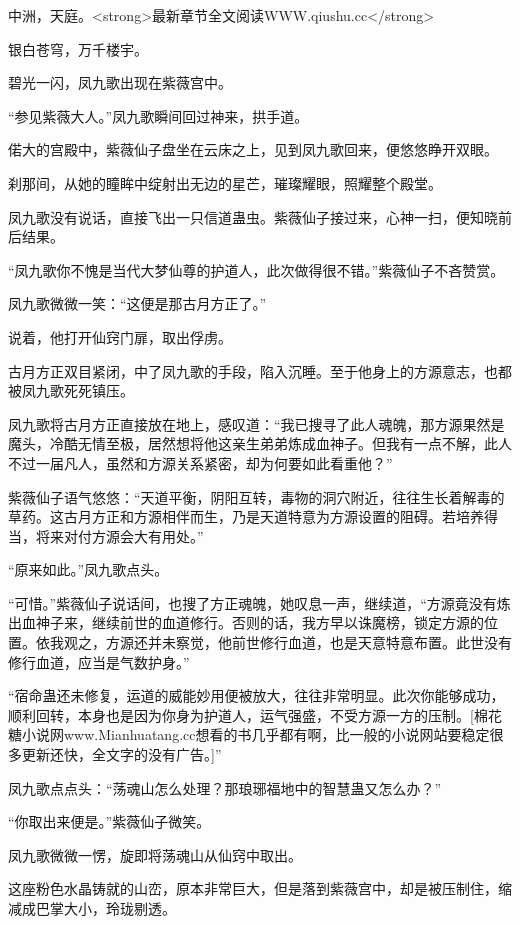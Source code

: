 
\begin{this_body}

中洲，天庭。<strong>最新章节全文阅读WWW.qiushu.cc</strong>

银白苍穹，万千楼宇。

碧光一闪，凤九歌出现在紫薇宫中。

“参见紫薇大人。”凤九歌瞬间回过神来，拱手道。

偌大的宫殿中，紫薇仙子盘坐在云床之上，见到凤九歌回来，便悠悠睁开双眼。

刹那间，从她的瞳眸中绽射出无边的星芒，璀璨耀眼，照耀整个殿堂。

凤九歌没有说话，直接飞出一只信道蛊虫。紫薇仙子接过来，心神一扫，便知晓前后结果。

“凤九歌你不愧是当代大梦仙尊的护道人，此次做得很不错。”紫薇仙子不吝赞赏。

凤九歌微微一笑：“这便是那古月方正了。”

说着，他打开仙窍门扉，取出俘虏。

古月方正双目紧闭，中了凤九歌的手段，陷入沉睡。至于他身上的方源意志，也都被凤九歌死死镇压。

凤九歌将古月方正直接放在地上，感叹道：“我已搜寻了此人魂魄，那方源果然是魔头，冷酷无情至极，居然想将他这亲生弟弟炼成血神子。但我有一点不解，此人不过一届凡人，虽然和方源关系紧密，却为何要如此看重他？”

紫薇仙子语气悠悠：“天道平衡，阴阳互转，毒物的洞穴附近，往往生长着解毒的草药。这古月方正和方源相伴而生，乃是天道特意为方源设置的阻碍。若培养得当，将来对付方源会大有用处。”

“原来如此。”凤九歌点头。

“可惜。”紫薇仙子说话间，也搜了方正魂魄，她叹息一声，继续道，“方源竟没有炼出血神子来，继续前世的血道修行。否则的话，我方早以诛魔榜，锁定方源的位置。依我观之，方源还并未察觉，他前世修行血道，也是天意特意布置。此世没有修行血道，应当是气数护身。”

“宿命蛊还未修复，运道的威能妙用便被放大，往往非常明显。此次你能够成功，顺利回转，本身也是因为你身为护道人，运气强盛，不受方源一方的压制。[棉花糖小说网www.Mianhuatang.cc想看的书几乎都有啊，比一般的小说网站要稳定很多更新还快，全文字的没有广告。]”

凤九歌点点头：“荡魂山怎么处理？那琅琊福地中的智慧蛊又怎么办？”

“你取出来便是。”紫薇仙子微笑。

凤九歌微微一愣，旋即将荡魂山从仙窍中取出。

这座粉色水晶铸就的山峦，原本非常巨大，但是落到紫薇宫中，却是被压制住，缩减成巴掌大小，玲珑剔透。


\end{this_body}
